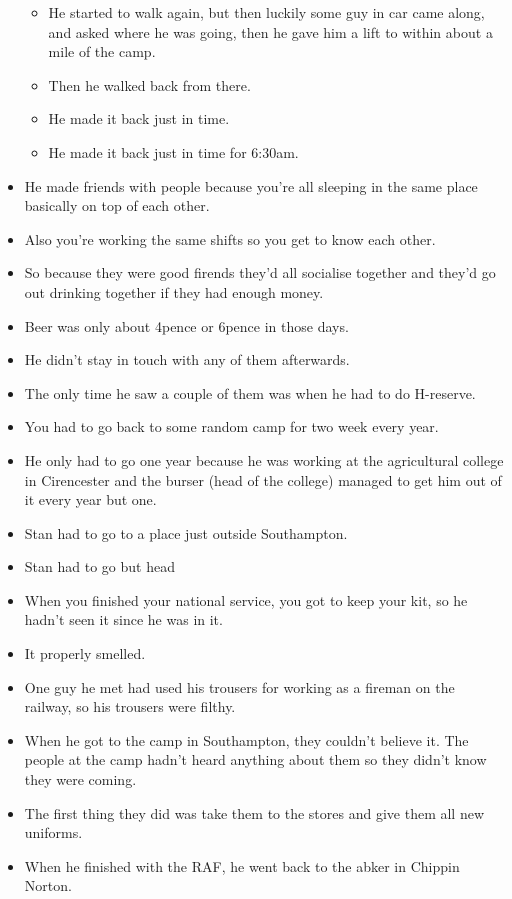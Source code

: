 \documentclass[10pt,twocolumn,letterpaper]{article}
\begin{document}
\begin{itemize}
\begin{itemize}
        \item He started to walk again, but then luckily some guy in car came along, and asked where he was going, then he gave him a lift to within about a mile of the camp.
        \item Then he walked back from there.
        \item He made it back just in time. 
        \item He made it back just in time for 6:30am.
    \end{itemize}
    \item He made friends with people because you're all sleeping in the same place basically on top of each other.
    \item Also you're working the same shifts so you get to know each other.
    \item So because they were good firends they'd all socialise together and they'd go out drinking together if they had enough money.
    \item Beer was only about 4pence or 6pence in those days.
    \item He didn't stay in touch with any of them afterwards.
    \item The only time he saw a couple of them was when he had to do H-reserve.
    \item You had to go back to some random camp for two week every year.
    \item He only had to go one year because he was working at the agricultural college in Cirencester and the burser (head of the college) managed to get him out of it every year but one.
    \item Stan had to go to a place just outside Southampton.
    \item Stan had to go but head
    \item When you finished your national service, you got to keep your kit, so he hadn't seen it since he was in it.
    \item It properly smelled.
    \item One guy he met had used his trousers for working as a fireman on the railway, so his trousers were filthy.
    \item When he got to the camp in Southampton, they couldn't believe it. The people at the camp hadn't heard anything about them so they didn't know they were coming.
    \item The first thing they did was take them to the stores and give them all new uniforms.
    \item When he finished with the RAF, he went back to the abker in Chippin Norton.

\end{itemize}
\end{document}
